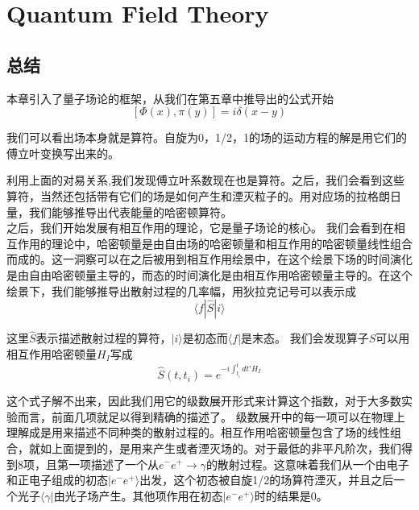 




\chapter[量子场论]{Quantum Field Theory}
\label{chap9}

\section*{总结}
本章引入了量子场论的框架，从我们在第五章中推导出的公式开始
$$[\Phi(x),\pi(y)]=i\delta(x-y)$$

我们可以看出场本身就是算符。自旋为0，1/2，1的场的运动方程的解是用它们的傅立叶变换写出来的。

利用上面的对易关系,我们发现傅立叶系数现在也是算符。之后，我们会看到这些算符，当然还包括带有它们的场是如何产生和湮灭粒子的。用对应场的拉格朗日量，我们能够推导出代表能量的哈密顿算符。\\
之后，我们开始发展有相互作用的理论，它是量子场论的核心。 我们会看到在相互作用的理论中，哈密顿量是由自由场的哈密顿量和相互作用的哈密顿量线性组合而成的。这一洞察可以在之后被用到相互作用绘景中，在这个绘景下场的时间演化是由自由哈密顿量主导的，而态的时间演化是由相互作用哈密顿量主导的。在这个绘景下，我们能够推导出散射过程的几率幅，用狄拉克记号可以表示成
$$\langle f | \hat{S} | i\rangle$$

这里$\hat{S}$表示描述散射过程的算符，$|i\rangle$是初态而$\langle f|$是末态。 我们会发现算子$\hat{S}$可以用相互作用哈密顿量$H_{I}$写成
$$\hat{S}(t,t_{i})=e^{-i\int_{t_{i}}^{t} dt' H_{I}}$$

这个式子解不出来，因此我们用它的级数展开形式来计算这个指数，对于大多数实验而言，前面几项就足以得到精确的描述了。
级数展开中的每一项可以在物理上理解成是用来描述不同种类的散射过程的。相互作用哈密顿量包含了场的线性组合，就如上面提到的，是用来产生或者湮灭场的。对于最低的非平凡阶次，我们得到8项，且第一项描述了一个从$e^{-} e^{+} \to \gamma$的散射过程。这意味着我们从一个由电子和正电子组成的初态$|e^{-}e^{+} \rangle$出发，这个初态被自旋1/2的场算符湮灭，并且之后一个光子$\langle \gamma |$由光子场产生。其他项作用在初态$|e^{-}e^{+} \rangle$时的结果是0。\\

